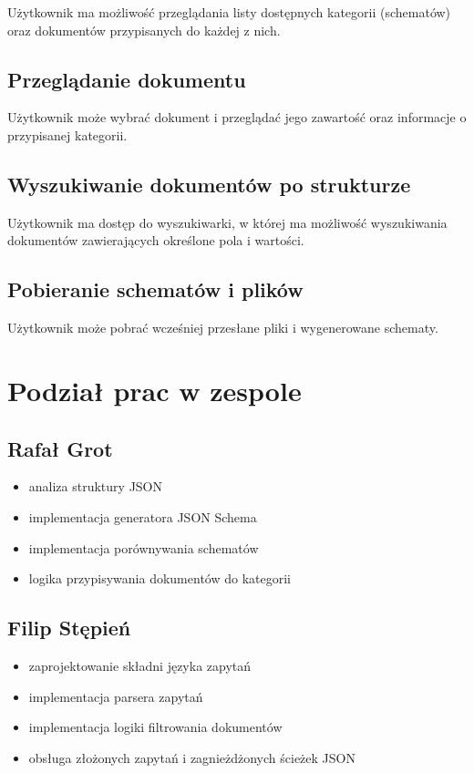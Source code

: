 \documentclass[a4paper,12pt]{article}
\begin{document}
Użytkownik ma możliwość przeglądania listy dostępnych kategorii (schematów) oraz dokumentów przypisanych do każdej z nich.

\subsection{Przeglądanie dokumentu}

Użytkownik może wybrać dokument i przeglądać jego zawartość oraz informacje o przypisanej kategorii.

\subsection{Wyszukiwanie dokumentów po strukturze}

Użytkownik ma dostęp do wyszukiwarki, w której ma możliwość wyszukiwania dokumentów zawierających określone pola i wartości.

\subsection{Pobieranie schematów i plików}

Użytkownik może pobrać wcześniej przesłane pliki i wygenerowane schematy.

\section{Podział prac w zespole}

\subsection*{Rafał Grot}

\begin{itemize}
  \item analiza struktury JSON
  \item implementacja generatora JSON Schema
  \item implementacja porównywania schematów
  \item logika przypisywania dokumentów do kategorii
\end{itemize}

\subsection*{Filip Stępień}

\begin{itemize}
  \item zaprojektowanie składni języka zapytań
  \item implementacja parsera zapytań
  \item implementacja logiki filtrowania dokumentów
  \item obsługa złożonych zapytań i zagnieżdżonych ścieżek JSON
\end{itemize}
\end{document}
